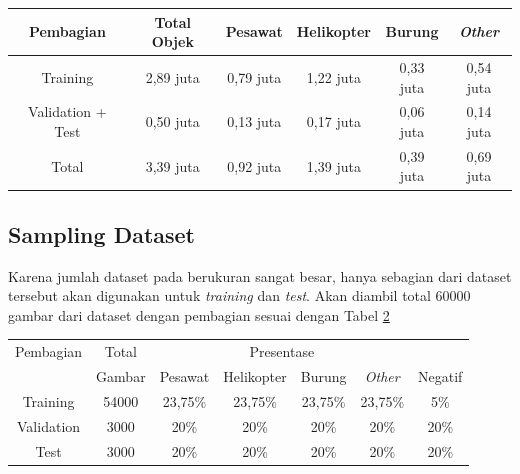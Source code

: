     \begin{table}[h]
      \centering
      \label{tbl:datasetclasses}
      \begin{tabular}{|c|c|c|c|c|c|}
        \hline
        Pembagian & Total Objek & Pesawat & Helikopter & Burung & \emph{Other}\\
        \hline
        Training & 2,89 juta & 0,79 juta& 1,22 juta& 0,33 juta& 0,54 juta\\
        \hline
        Validation + Test &0,50 juta &0,13 juta & 0,17 juta&0,06 juta&0,14 juta\\
        \hline
        Total &3,39 juta &0,92 juta & 1,39 juta&0,39 juta&0,69 juta\\
        \hline
      \end{tabular}
    \end{table}
  
  \subsection{Sampling Dataset}
    Karena jumlah dataset pada \textcite{aot_dataset} berukuran sangat besar, hanya sebagian dari dataset tersebut akan digunakan untuk \emph{training} dan \emph{test}.
    Akan diambil total 60000 gambar dari dataset dengan pembagian sesuai dengan Tabel \ref{tbl:datasetsamplingdist}
    \begin{table}[h]
      \centering
      \label{tbl:datasetsamplingdist}
      \begin{tabular}{|c|c|c|c|c|c|c|}
        \hline
        Pembagian &Total & \multicolumn{4}{c}{Presentase}&\\
                           \cline{2-7}
                  &Gambar& Pesawat & Helikopter & Burung & \emph{Other} & Negatif\\
        \hline
        Training  &54000 &23,75\%  &23,75\%     &23,75\% &23,75\%       &5\%\\
        \hline                                              
        Validation&3000  &20\%     &20\%        &20\%    &20\%          &20\%\\
        \hline                                                           
        Test      &3000  &20\%     &20\%        &20\%    &20\%          &20\%\\
        \hline
      \end{tabular}
    \end{table}

